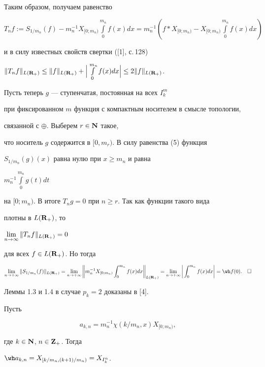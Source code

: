 Таким образом, получаем равенство


$T_nf:=S_{1/m_n}(f) - m_n^{-1}X_{[0;m_n)}\int\limits_0^{m_n}f(x)dx=


m_n^{-1}(f*X_{[0;m_n)}-X_{[0;m_n)}\int\limits_0^{m_n}f(x)dx)$


и в силу известных свойств свертки ([1], с.\,128)


$\|T_nf\|_{L({\bold R}_+)}\leq \|f\|_{L({\bold R}_+)}+


\Big|\int\limits_0^{m_n}f(x)dx\Big|\leq 2\|f\|_{L({\bold R}_+)}$.





Пусть теперь $g$ --- ступенчатая, постоянная на всех $I^m_k$ 


при фиксированном $m$ функция с компактным носителем в смысле топологии, 


связанной с $\oplus$. Выберем $r\in {\bold N}$ такое, 


что носитель $g$ содержится в $[0,m_r)$. В силу равенства (5) функция


$S_{1/m_n}(g)(x)$ равна нулю при $x\geq m_n$ и равна


$m_n^{-1}\int\limits_0^{m_n}g(t)dt$ 


на $[0;m_n)$. В итоге $T_ng=0$ при $n\geq r$. Так как функции такого вида 


плотны в $L({\bold R}_+)$, то


$\lim\limits_{n\to\infty}\|T_nf\|_{L({\bold R}_+)}=0$


для всех $f\in L({\bold R}_+)$. Но тогда


$$


\lim\limits_{n\to+\infty}\|S_{1/m_n}(f)\|_{L({\bold R}_+)}=


\lim\limits_{n\to+\infty}\bigg\|m_n^{-1}X_{[0;m_n)}


\int_0^{m_n}f(x)dx\bigg\|_{L({\bold R}_+)}=


\lim\limits_{n\to+\infty}\bigg|\int^{m_n}_0f(x)dx\bigg|={\wh f}(0).


\quad\square


$$





Леммы 1.3 и 1.4 в случае $p_k=2$ доказаны в [4].








\begin{lems}


Пусть


\begin{equation}


a_{k,n}=m_n^{-1}\chi(k/m_n,x)X_{[0;m_n)},


\end{equation}


где $k\in{\bold N}$, $n\in {\bold Z}_+$. Тогда


${\wh a}_{k,n}=X_{[k/m_n,(k+1)/m_n)}=X_{I^n_k}$.


\end{lems}








